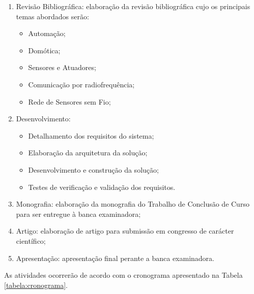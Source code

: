 \documentclass[
    12pt,               %
    a4paper,            %
    english,            %
    brazil,             %
    ]{article}
\begin{document}
\begin{enumerate}

	\item Revisão Bibliográfica: elaboração da revisão bibliográfica cujo os principais temas abordados serão:
		\begin{itemize}
			\item Automação;
			\item Domótica;
			\item Sensores e Atuadores;
			\item Comunicação por radiofrequência;
			\item Rede de Sensores sem Fio;
		\end{itemize}

	\item Desenvolvimento:
		\begin{itemize}
			\item Detalhamento dos requisitos do sistema;
			\item Elaboração da arquitetura da solução;
			\item Desenvolvimento e construção da solução;
			\item Testes de verificação e validação dos requisitos.
		\end{itemize}

	\item Monografia: elaboração da monografia do Trabalho de Conclusão de Curso para ser entregue à banca examinadora;

	\item Artigo: elaboração de artigo para submissão em congresso de carácter científico;

	\item Apresentação: apresentação final perante a banca examinadora.

\end{enumerate}

As atividades ocorrerão de acordo com o cronograma apresentado na Tabela \ref{tabela:cronograma}.
\end{document}
